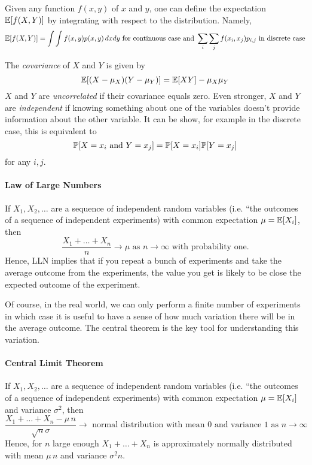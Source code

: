 Given any function $f(x,y)$ of $x$ and $y$, one can define the expectation $\E[f(X,Y)]$ by integrating with respect to the distribution. Namely, 
\[
\E[f(X,Y)]=\int \int f(x,y)p(x,y)\,dxdy \mbox{ for continuous case and } \sum_i \sum_j f(x_i,x_j) p_{i,j} \mbox{ in discrete case}
\]

The \emph{covariance} of  $X$ and $Y$ is given by 
\[
\E[(X-\mu_X)(Y-\mu_Y)]=\E[XY]-\mu_X\mu_Y
\]
$X$ and $Y$ are \emph{uncorrelated} if their covariance equals zero. Even stronger, $X$ and $Y$ are \emph{independent} if knowing something about one of the variables doesn't provide information about the other variable. It can be show, for example in the discrete case, this is equivalent to 
\[
\P[X=x_i\mbox{ and } Y=x_j]=\P[X=x_i]\P[Y=x_j]
\] 
for any $i,j$.  



\paragraph{Law of Large Numbers} If $X_1,X_2,\dots$ are a sequence of independent random variables (i.e. ``the outcomes of a sequence of independent experiments) with common expectation $\mu= \E[X_i]$, then 
\[
\frac{X_1+\dots +X_n}{n} \to \mu \mbox{ as }n\to \infty \mbox{ with probability one.}
\]
Hence, LLN implies that if you repeat a bunch of experiments and take the average outcome from the experiments, the value you get is likely to be close the expected outcome of the experiment. 

Of course, in the real world, we can only perform a finite number of experiments in which case it is useful to have a sense of how much variation there will be in the average outcome. The central theorem is the key tool for understanding this variation. 

\paragraph{Central Limit Theorem} If $X_1,X_2,\dots$ are a sequence of independent random variables (i.e. ``the outcomes of a sequence of independent experiments) with common expectation $\mu= \E[X_i]$ and variance $\sigma^2$, then 
\[
\frac{X_1+\dots +X_n-\mu \,n }{\sqrt{n}\sigma} \to \mbox{ normal distribution with mean $0$ and variance $1$ as $n\to \infty$ }
\]
Hence, for $n$ large enough 
$
X_1+\dots+X_n 
$
is approximately normally distributed with mean $\mu\,n$ and variance $\sigma^2 n$. 
